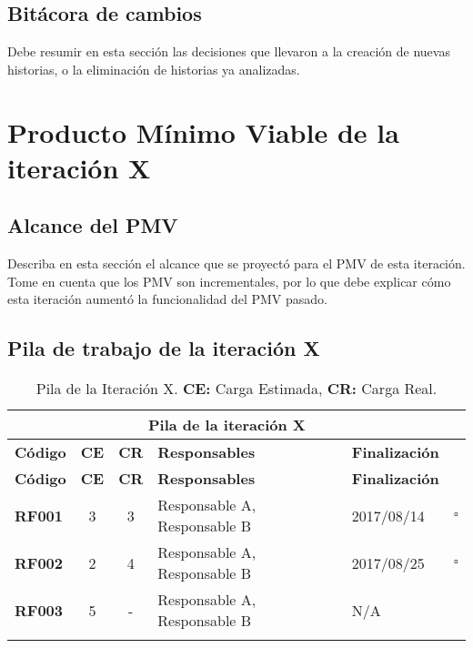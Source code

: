 \subsection{Bitácora de cambios}
Debe resumir en esta sección las decisiones que llevaron a la creación de nuevas historias, o la eliminación de historias ya analizadas. 

\section{Producto Mínimo Viable de la iteración X}

\subsection{Alcance del PMV}
Describa en esta sección el alcance que se proyectó para el PMV de esta iteración. Tome en cuenta que los PMV son incrementales, por lo que debe explicar cómo esta iteración aumentó la funcionalidad del PMV pasado.

\subsection{Pila de trabajo de la iteración X}


\begin{longtable}{|l||c|c|p{7cm}|l|c|}

\multicolumn{5}{c}{Pila de la \textbf{iteración X} }\\
\hline\hline
\textbf{Código} & \textbf{CE} & \textbf{CR} & \textbf{Responsables} & \textbf{Finalización}& \\
\hline
\endfirsthead
\textbf{Código} & \textbf{CE} & \textbf{CR} & \textbf{Responsables} & \textbf{Finalización} & \\
\hline\hline
\endhead

\textbf{RF001} & 3 & 3 & Responsable A, Responsable B & 2017/08/14 & $\square$\\

\color{ForestGreen}
\textbf{RF002} & 2 & 4 & Responsable A, Responsable B & 2017/08/25 & $\square$\\

\color{Mahogany}
\textbf{RF003} & 5 & - & Responsable A, Responsable B & N/A &  \\
\hline

\caption{Pila de la Iteración X. \textbf{CE:} Carga Estimada, \textbf{CR:} Carga Real.}
\label{SprintBacklog}


\end{longtable}

